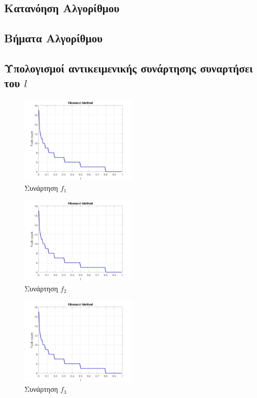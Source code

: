 \subsection{Κατανόηση Αλγορίθμου}

\subsection{Βήματα Αλγορίθμου}

\subsection{Υπολογισμοί αντικειμενικής συνάρτησης συναρτήσει του $l$}
\begin{figure}[H] %
    \centering
    \includegraphics[width=0.5\textwidth]{media/fibonaccif1} %
    \caption{Συνάρτηση $f_1$}
\end{figure}

\begin{figure}[H] %
    \centering
    \includegraphics[width=0.5\textwidth]{media/fibonaccif2} %
    \caption{Συνάρτηση $f_2$}
\end{figure}

\begin{figure}[H] %
    \centering
    \includegraphics[width=0.5\textwidth]{media/fibonaccif3} %
    \caption{Συνάρτηση $f_3$}
\end{figure}
